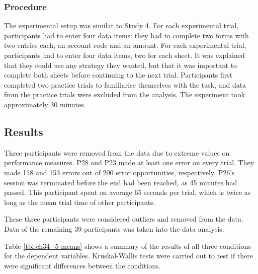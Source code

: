 \subsubsection{Procedure}
The experimental setup was similar to Study 4. For each experimental trial, participants had to enter four data items: they had to complete two forms with two entries each, an account code and an amount. For each experimental trial, participants had to enter four data items, two for each sheet. It was explained that they could use any strategy they wanted, but that it was important to complete both sheets before continuing to the next trial. Participants first completed two practice trials to familiarise themselves with the task, and data from the practice trials were excluded from the analysis. The experiment took approximately 30 minutes.

\subsection{Results}
Three participants were removed from the data due to extreme values on performance measures.
P28 and P23 made at least one error on every trial. They made 118 and 153 errors out of 200 error opportunities, respectively. P26's session was terminated before the end had been reached, as 45 minutes had passed. This participant spent on average 65 seconds per trial, which is twice as long as the mean trial time of other participants.

These three participants were considered outliers and removed from the data. Data of the remaining 39 participants was taken into the data analysis.

Table \ref{tbl:ch34_5-means} shows a summary of the results of all three conditions for the dependent variables. Kruskal-Wallis tests were carried out to test if there were significant differences between the conditions.

